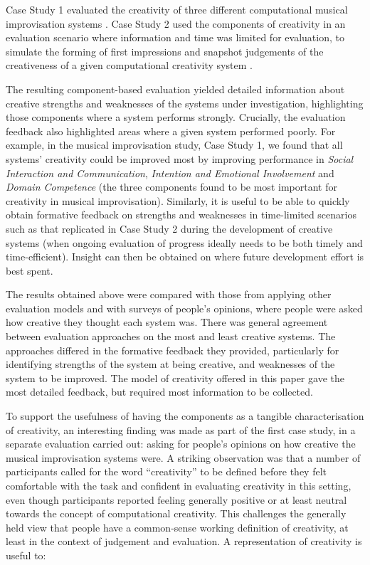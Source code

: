 \documentclass[10pt,letterpaper]{article}
\begin{document}
Case Study 1 \cite{jordanousphd,jordanous12cc} evaluated the creativity of three different computational musical improvisation systems \cite{jordanous12cc}. 
Case Study 2 used the components of creativity in an evaluation scenario where information and time was limited for evaluation, to simulate the forming of first impressions and snapshot judgements of the creativeness of a given computational creativity system \cite{jordanousphd,jordanous16aisb}. 

The resulting component-based evaluation yielded detailed information about creative strengths and weaknesses of the systems under investigation, highlighting those components where a system performs strongly. Crucially, the evaluation feedback also highlighted areas where a given system performed poorly. For example, in the musical improvisation study, Case Study 1, we found that all systems' creativity could be improved most by improving performance in {\em Social Interaction and Communication}, {\em Intention and Emotional Involvement} and {\em Domain Competence} (the three components found to be most important for creativity in musical improvisation). Similarly, it is useful to be able to quickly obtain formative feedback on strengths and weaknesses in time-limited scenarios such as that replicated in Case Study 2 during the development of creative systems (when ongoing evaluation of progress ideally needs to be both timely and time-efficient). Insight can then be obtained on where future development effort is best spent. 

The results obtained above were compared with those from applying other evaluation models and with surveys of people's opinions, where people were asked how creative they thought each system was. There was general agreement between evaluation approaches on the most and least creative systems. The approaches differed in the formative feedback they provided, particularly for identifying strengths of the system at being creative, and weaknesses of the system to be improved. The model of creativity offered in this paper gave the most detailed feedback, but required most information to be collected. 

To support the usefulness of having the components as a tangible characterisation of creativity, an interesting finding was made as part of the first case study, in a separate evaluation carried out: asking for people's opinions on how creative the musical improvisation systems were. A striking observation was that a number of participants called for the word ``creativity'' to be defined before they felt comfortable with the task and confident in evaluating creativity in this setting, even though participants reported feeling generally positive or at least neutral towards the concept of computational creativity. This challenges the generally held view that people have a  common-sense working definition of creativity, at least in the context of judgement and evaluation. A representation of creativity is useful to:
\end{document}

